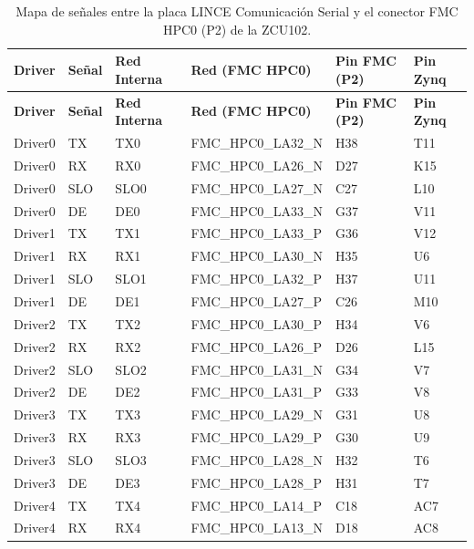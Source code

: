 {\small
\begin{longtable}{llllll}
    \hline
    \textbf{Driver} & \textbf{Señal} & \textbf{Red Interna} & \textbf{Red (FMC HPC0)} & \textbf{Pin FMC (P2)} & \textbf{Pin Zynq} \\
    \hline
    \endfirsthead
    \hline
    \textbf{Driver} & \textbf{Señal} & \textbf{Red Interna} & \textbf{Red (FMC HPC0)} & \textbf{Pin FMC (P2)} & \textbf{Pin Zynq} \\
    \hline
    \endhead
    \hline
    \endfoot
    \hline
    \caption{Mapa de señales entre la placa LINCE Comunicación Serial y el conector FMC HPC0 (P2) de la ZCU102.}
    \label{tab:mapa_lince_serial}
    \endlastfoot
    Driver0 & TX  & TX0   & FMC\_HPC0\_LA32\_N      & H38 & T11  \\
    Driver0 & RX  & RX0   & FMC\_HPC0\_LA26\_N      & D27 & K15  \\
    Driver0 & SLO & SLO0  & FMC\_HPC0\_LA27\_N      & C27 & L10  \\
    Driver0 & DE  & DE0   & FMC\_HPC0\_LA33\_N      & G37 & V11  \\
    Driver1 & TX  & TX1   & FMC\_HPC0\_LA33\_P      & G36 & V12  \\
    Driver1 & RX  & RX1   & FMC\_HPC0\_LA30\_N      & H35 & U6   \\
    Driver1 & SLO & SLO1  & FMC\_HPC0\_LA32\_P      & H37 & U11  \\
    Driver1 & DE  & DE1   & FMC\_HPC0\_LA27\_P      & C26 & M10  \\
    Driver2 & TX  & TX2   & FMC\_HPC0\_LA30\_P      & H34 & V6   \\
    Driver2 & RX  & RX2   & FMC\_HPC0\_LA26\_P      & D26 & L15  \\
    Driver2 & SLO & SLO2  & FMC\_HPC0\_LA31\_N      & G34 & V7   \\
    Driver2 & DE  & DE2   & FMC\_HPC0\_LA31\_P      & G33 & V8   \\
    Driver3 & TX  & TX3   & FMC\_HPC0\_LA29\_N      & G31 & U8   \\
    Driver3 & RX  & RX3   & FMC\_HPC0\_LA29\_P      & G30 & U9   \\
    Driver3 & SLO & SLO3  & FMC\_HPC0\_LA28\_N      & H32 & T6   \\
    Driver3 & DE  & DE3   & FMC\_HPC0\_LA28\_P      & H31 & T7   \\
    Driver4 & TX  & TX4   & FMC\_HPC0\_LA14\_P      & C18 & AC7  \\
    Driver4 & RX  & RX4   & FMC\_HPC0\_LA13\_N      & D18 & AC8  \\

\end{longtable}}
